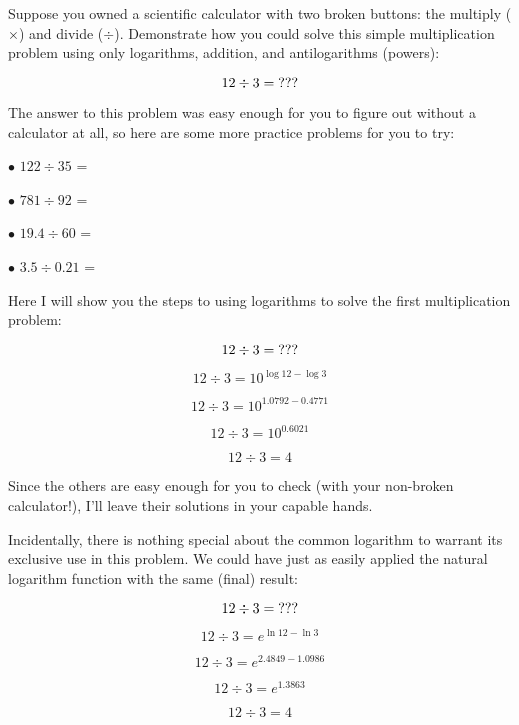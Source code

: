 

Suppose you owned a scientific calculator with two broken buttons: the multiply ($\times$) and divide ($\div$).  Demonstrate how you could solve this simple multiplication problem using only logarithms, addition, and antilogarithms (powers):

$$12 \div 3 = \hbox{???}$$

The answer to this problem was easy enough for you to figure out without a calculator at all, so here are some more practice problems for you to try:

\medskip
\goodbreak
\item{$\bullet$} $122 \div 35$ = 
\vskip 5pt
\item{$\bullet$} $781 \div 92$ = 
\vskip 5pt
\item{$\bullet$} $19.4 \div 60$ = 
\vskip 5pt
\item{$\bullet$} $3.5 \div 0.21$ = 
\medskip







Here I will show you the steps to using logarithms to solve the first multiplication problem:

$$12 \div 3 = \hbox{???}$$

$$12 \div 3 = 10^{\log 12 - \log 3}$$

$$12 \div 3 = 10^{1.0792 - 0.4771}$$

$$12 \div 3 = 10^{0.6021}$$

$$12 \div 3 = 4$$

Since the others are easy enough for you to check (with your non-broken calculator!), I'll leave their solutions in your capable hands.







Incidentally, there is nothing special about the common logarithm to warrant its exclusive use in this problem.  We could have just as easily applied the natural logarithm function with the same (final) result:

$$12 \div 3 = \hbox{???}$$

$$12 \div 3 = e^{\ln 12 - \ln 3}$$

$$12 \div 3 = e^{2.4849 - 1.0986}$$

$$12 \div 3 = e^{1.3863}$$

$$12 \div 3 = 4$$




